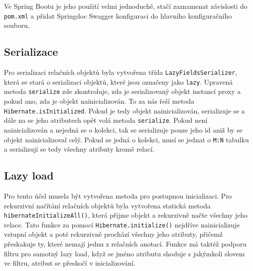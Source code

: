 Ve Spring Bootu je jeho použití velmi jednoduché, stačí zaznamenat závislosti do \texttt{pom.xml} a přidat Springdoc Swagger konfiguraci do hlavního konfiguračního souboru.

\subsection{Serializace}\label{sec:impl:serialization}
Pro serializaci  relačních objektů byla vytvořena třída \texttt{LazyFieldsSerializer}, která se stará o serializaci objektů, které jsou označeny jako \texttt{lazy}.
Upravená metoda \texttt{serialize} zde zkontroluje, zda je serializovaný objekt instancí proxy a pokud ano, zda je objekt nainicializován. To za nás řeší metoda \texttt{Hibernate.isInitialized}.
Pokud je tedy objekt nainicializován, serializuje se a dále na se jeho atributech opět volá metoda \texttt{serialize}. Pokud není nainicializován a nejedná se o kolekci, tak se serializuje pouze jeho id aniž by se objekt nainicializoval celý.
Pokud se jedná o kolekci, musí se jednat o \texttt{M:N} tabulku a serializují se tedy všechny atributy kromě relací.


\subsection{Lazy load}\label{sec:impl:lazyload}
Pro tento účel musela být vytvořena metoda pro postupnou inicializaci. Pro rekurzivní načítání relačních objektů byla vytvořena statická metoda \texttt{hibernateInitializeAll()}, která přijme objekt a rekurzivně načte všechny jeho relace.
Tato funkce za pomocí \texttt{Hibernate.initialize()} nejdříve nainicializuje vstupní objekt a poté rekurzivně prochází všechny jeho atributy, přičemž přeskakuje ty, které nemají jednu z relačních anotací. Funkce má taktéž podporu filtru pro samotný lazy load, když se jméno atributu shoduje s jakýmkoli slovem ve filtru, atribut se přeskočí v inicializování.


